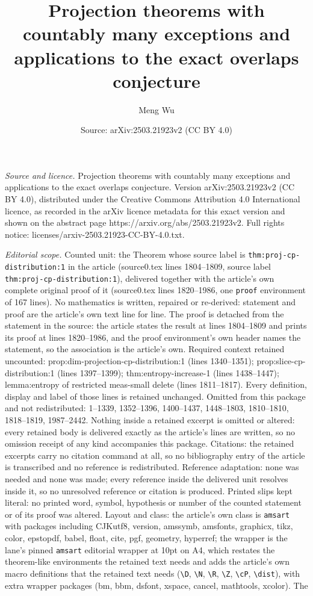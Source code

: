 \documentclass[10pt,a4paper]{amsart}
\title[Projection theorems with countably many exceptions and appli]{Projection theorems with countably many exceptions and applications to the exact overlaps conjecture}
\author{Meng Wu}
\date{Source: arXiv:2503.21923v2 (CC BY 4.0)}
\begin{document}
\maketitle

\noindent\emph{Source and licence.} Projection theorems with countably many exceptions and applications to the exact overlaps conjecture. Version arXiv:2503.21923v2 (CC BY 4.0), distributed under the Creative Commons Attribution 4.0 International licence, as recorded in the arXiv licence metadata for this exact version and shown on the abstract page https://arxiv.org/abs/2503.21923v2. Full rights notice: licenses/arxiv-2503.21923-CC-BY-4.0.txt.\par\smallskip

\noindent\textit{Editorial scope.} Counted unit: the Theorem whose source label is \texttt{thm:proj-cp-distribution:1} in the article (source0.tex lines 1804--1809, source label \texttt{thm:proj-cp-distribution:1}), delivered together with the article's own complete original proof of it (source0.tex lines 1820--1986, one \texttt{proof} environment of 167 lines). No mathematics is written, repaired or re-derived: statement and proof are the article's own text line for line. The proof is detached from the statement in the source: the article states the result at lines 1804--1809 and prints its proof at lines 1820--1986, and the proof environment's own header names the statement, so the association is the article's own. Required context retained uncounted: prop:dim-projection-cp-distribution:1 (lines 1340--1351); prop:slice-cp-distribution:1 (lines 1397--1399); thm:entropy-increase-1 (lines 1438--1447); lemma:entropy of restricted meas-small delete (lines 1811--1817). Every definition, display and label of those lines is retained unchanged. Omitted from this package and not redistributed: 1--1339, 1352--1396, 1400--1437, 1448--1803, 1810--1810, 1818--1819, 1987--2442. Nothing inside a retained excerpt is omitted or altered: every retained body is delivered exactly as the article's lines are written, so no omission receipt of any kind accompanies this package. Citations: the retained excerpts carry no citation command at all, so no bibliography entry of the article is transcribed and no reference is redistributed. Reference adaptation: none was needed and none was made; every reference inside the delivered unit resolves inside it, so no unresolved reference or citation is produced. Printed slips kept literal: no printed word, symbol, hypothesis or number of the counted statement or of its proof was altered. Layout and class: the article's own class is \texttt{amsart} with packages including CJKutf8, version, amssymb, amsfonts, graphicx, tikz, color, epstopdf, babel, float, cite, pgf, geometry, hyperref; the wrapper is the lane's pinned \texttt{amsart} editorial wrapper at 10pt on A4, which restates the theorem-like environments the retained text needs and adds the article's own macro definitions that the retained text needs (\texttt{\textbackslash D}, \texttt{\textbackslash N}, \texttt{\textbackslash R}, \texttt{\textbackslash Z}, \texttt{\textbackslash cP}, \texttt{\textbackslash dist}), with extra wrapper packages (bm, bbm, dsfont, xspace, cancel, mathtools, xcolor). The 
\end{document}
